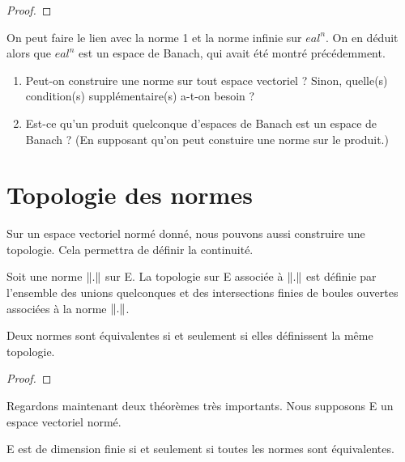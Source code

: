 \ifdefined\outputproof
\begin{proof}

\end{proof}
\fi

\begin{exemple}
	On peut faire le lien avec la norme 1 et la norme infinie sur
	$
eal^{n}$. On en déduit alors que $
eal^{n}$ est un espace de
	Banach, qui avait été montré précédemment.
\end{exemple}

\begin{question}
	\begin{enumerate}
		\item Peut-on construire une norme sur tout espace vectoriel ?
			Sinon, quelle(s) condition(s) supplémentaire(s) a-t-on besoin ?
		\item Est-ce qu'un produit quelconque d'espaces de Banach est un
			espace de Banach ? (En supposant qu'on peut constuire une norme
			sur le produit.)
	\end{enumerate}
\end{question}

\section{Topologie des normes}

Sur un espace vectoriel normé donné, nous pouvons aussi construire une
topologie. Cela permettra de définir la continuité.

\begin{definition}
	Soit une norme $\norm{.}$ sur E. La topologie sur E associée à $\norm{.}$
	est définie par l'ensemble des unions quelconques et des intersections
	finies de boules ouvertes associées à la norme $\norm{.}$.
\end{definition}

\begin{proposition}
	Deux normes sont équivalentes si et seulement si elles définissent la même topologie.
\end{proposition}

\ifdefined\outputproof
\begin{proof}

\end{proof}
\fi

Regardons maintenant deux théorèmes très importants. Nous supposons E un espace
vectoriel normé.

\begin{theorem}
	E est de dimension finie si et seulement si toutes les normes sont équivalentes.
\end{theorem}

